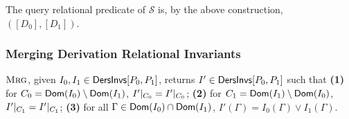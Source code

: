 The query relational predicate of $\mathcal{S}$ is, by the above
construction, $( [ D_0 ], [ D_1 ])$.

\subsubsection{Merging Derivation Relational Invariants}
$\textsc{Mrg}$, given $I_0, I_1 \in \mathsf{DersInvs}[ P_0, P_1 ]$, returns $I'
\in \mathsf{DersInvs}[ P_0, P_1 ]$ such that
\textbf{(1)} for $C_0 = \mathsf{Dom}(I_0) \setminus \mathsf{Dom}(I_1)$,
$I'|_{C_0} = I'|_{C_0}$; 
\textbf{(2)} for $C_1 = \mathsf{Dom}(I_1) \setminus \mathsf{Dom}(I_0)$,
$I'|_{C_1} = I'|_{C_1}$;
\textbf{(3)} for all $\Gamma \in \mathsf{Dom}(I_0) \cap
\mathsf{Dom}(I_1)$, $I'(\Gamma) = I_0(\Gamma) \lor I_1(\Gamma)$.

